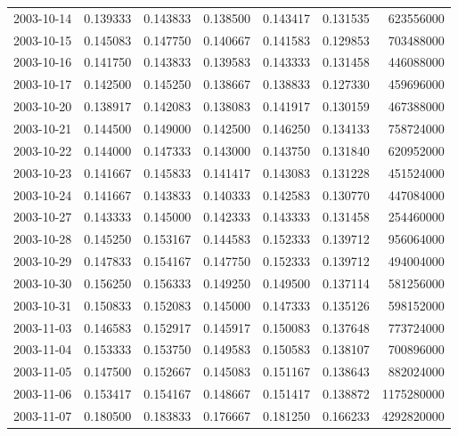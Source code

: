 \begin{tabular}{lrrrrrr}
2003-10-14 &    0.139333 &    0.143833 &    0.138500 &    0.143417 &    0.131535 &   623556000 \\
2003-10-15 &    0.145083 &    0.147750 &    0.140667 &    0.141583 &    0.129853 &   703488000 \\
2003-10-16 &    0.141750 &    0.143833 &    0.139583 &    0.143333 &    0.131458 &   446088000 \\
2003-10-17 &    0.142500 &    0.145250 &    0.138667 &    0.138833 &    0.127330 &   459696000 \\
2003-10-20 &    0.138917 &    0.142083 &    0.138083 &    0.141917 &    0.130159 &   467388000 \\
2003-10-21 &    0.144500 &    0.149000 &    0.142500 &    0.146250 &    0.134133 &   758724000 \\
2003-10-22 &    0.144000 &    0.147333 &    0.143000 &    0.143750 &    0.131840 &   620952000 \\
2003-10-23 &    0.141667 &    0.145833 &    0.141417 &    0.143083 &    0.131228 &   451524000 \\
2003-10-24 &    0.141667 &    0.143833 &    0.140333 &    0.142583 &    0.130770 &   447084000 \\
2003-10-27 &    0.143333 &    0.145000 &    0.142333 &    0.143333 &    0.131458 &   254460000 \\
2003-10-28 &    0.145250 &    0.153167 &    0.144583 &    0.152333 &    0.139712 &   956064000 \\
2003-10-29 &    0.147833 &    0.154167 &    0.147750 &    0.152333 &    0.139712 &   494004000 \\
2003-10-30 &    0.156250 &    0.156333 &    0.149250 &    0.149500 &    0.137114 &   581256000 \\
2003-10-31 &    0.150833 &    0.152083 &    0.145000 &    0.147333 &    0.135126 &   598152000 \\
2003-11-03 &    0.146583 &    0.152917 &    0.145917 &    0.150083 &    0.137648 &   773724000 \\
2003-11-04 &    0.153333 &    0.153750 &    0.149583 &    0.150583 &    0.138107 &   700896000 \\
2003-11-05 &    0.147500 &    0.152667 &    0.145083 &    0.151167 &    0.138643 &   882024000 \\
2003-11-06 &    0.153417 &    0.154167 &    0.148667 &    0.151417 &    0.138872 &  1175280000 \\
2003-11-07 &    0.180500 &    0.183833 &    0.176667 &    0.181250 &    0.166233 &  4292820000 \\

\end{tabular}

